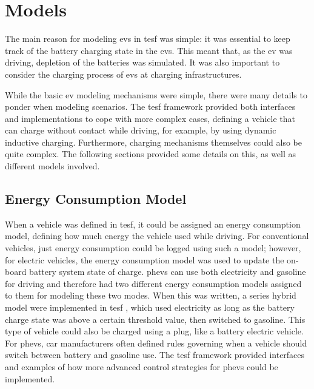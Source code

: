 \section{Models}
The main reason for modeling \glspl{ev} in \gls{tesf} was simple: it was essential to keep track of the battery charging state in the \glspl{ev}. This meant that, as the \gls{ev} was driving, depletion of the batteries was simulated. It was also important to consider the charging process of \glspl{ev} at charging infrastructures.

While the basic \gls{ev} modeling mechanisms were simple, there were many details to ponder when modeling scenarios. 
The \gls{tesf} framework provided both interfaces and implementations to cope with more complex cases, \eg defining a vehicle that can charge without contact while driving,
 
for example, by using dynamic inductive charging. Furthermore, charging mechanisms themselves could also be quite complex. The following sections provided some details on this, as well as different models involved.

\subsection{Energy Consumption Model}
When a vehicle was defined in \gls{tesf}, it could be assigned an energy consumption model, defining how much energy the vehicle used while driving. For conventional vehicles, just energy consumption could be logged using such a model; however, for electric vehicles, the energy consumption model was used to update the on-board battery system state of charge. \glspl{phev} can use both electricity and gasoline for driving and therefore had two different energy consumption models assigned to them for modeling these two modes. When this was written, a series hybrid model were implemented in \gls{tesf} \citep[][]{Chan_PIEEE_2007}, which used electricity as long as the battery charge state was above a certain threshold value, then switched to gasoline. This type of vehicle could also be charged using a plug, like a battery electric vehicle. For \glspl{phev}, car manufacturers often defined rules governing when a vehicle should switch between battery and gasoline use. The \gls{tesf} framework provided interfaces and examples of how more advanced control strategies for \glspl{phev} could be implemented.

